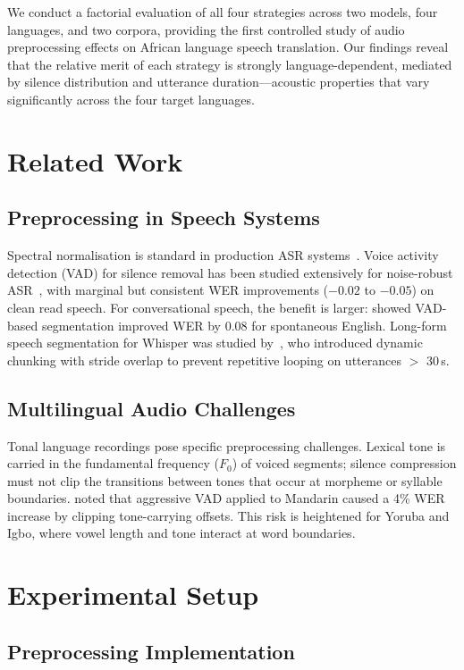 \documentclass[a4paper]{article}
\begin{document}
We conduct a factorial evaluation of all four strategies across two models, four languages, and two corpora, providing the first controlled study of audio preprocessing effects on African language speech translation. Our findings reveal that the relative merit of each strategy is strongly language-dependent, mediated by silence distribution and utterance duration—acoustic properties that vary significantly across the four target languages.

\section{Related Work}
\label{sec:related}

\subsection{Preprocessing in Speech Systems}
Spectral normalisation is standard in production ASR systems~\citep{watanabe2018espnet}. Voice activity detection (VAD) for silence removal has been studied extensively for noise-robust ASR~\citep{ramirez2007vad}, with marginal but consistent WER improvements ($-0.02$ to $-0.05$) on clean read speech. For conversational speech, the benefit is larger: \citet{zhu2022speech} showed VAD-based segmentation improved WER by 0.08 for spontaneous English. Long-form speech segmentation for Whisper was studied by~\citet{radford2023whisper}, who introduced dynamic chunking with stride overlap to prevent repetitive looping on utterances $>$ 30\,s.

\subsection{Multilingual Audio Challenges}
Tonal language recordings pose specific preprocessing challenges. Lexical tone is carried in the fundamental frequency ($F_0$) of voiced segments; silence compression must not clip the transitions between tones that occur at morpheme or syllable boundaries. \citet{li2019tonal} noted that aggressive VAD applied to Mandarin caused a 4\% WER increase by clipping tone-carrying offsets. This risk is heightened for Yoruba and Igbo, where vowel length and tone interact at word boundaries.

\section{Experimental Setup}
\label{sec:setup}

\subsection{Preprocessing Implementation}
\end{document}
